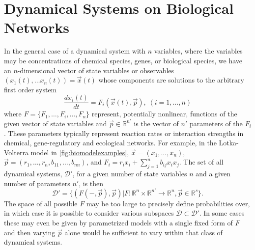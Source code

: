 \section{Dynamical Systems on Biological Networks}

In the general case of a dynamical system with $n$ variables, where the variables may be concentrations of chemical species, genes, or biological species, we have an $n$-dimensional vector of state variables or observables $(x_1(t), \ldots x_n(t)) = \vec{x}(t)
$
whose components are solutions to the arbitrary first order system
\begin{equation}\label{eq:eom}
\frac{dx_i(t)}{dt} = F_i(\vec{x}(t), \vec{p}), \; (i=1,\ldots,n)
\end{equation}
where $F=\{F_1,\ldots,F_i,\ldots,F_n\}$ represent, potentially nonlinear, functions of the given vector of state variables and $\vec{p} \in \mathbb{R}^{n'}$ is the vector of $n'$ parameters of the $F_i$. These parameters typically represent reaction rates or interaction strengths in chemical, gene-regulatory and ecological networks. For example, in the Lotka-Volterra model in \ref{fig:biomodelexamples}, $\vec{x} = (x_1, \ldots, x_n)$, $\vec{p}=(r_1,\ldots,r_n,b_{11},\ldots,b_{nn})$, and $F_i = r_i x_i + \sum_{j=1}^{n} b_{ij} x_i x_j$. The set of all dynamical systems, $\mathcal{D}'$, for a given number of state variables $n$ and a given number of parameters $n'$, is then
\begin{equation}\label{eq:setdynsys}
\mathcal{D}' = \{ (F(-,\vec{p}),\vec{p}) | F \colon \mathbb{R}^n \times \mathbb{R}^{n'} \rightarrow \mathbb{R}^n, \vec{p} \in \mathbb{R}^s \}.
\end{equation}
The space of all possible $F$ may be too large to precisely define probabilities over, in which case it is possible to consider various subspaces $\mathcal{D} \subset \mathcal{D}'$. In some cases these may even be given by parametrized models with a single fixed form of $F$ and then varying $\vec{p}$ alone would be sufficient to vary within that class of dynamical systems.

